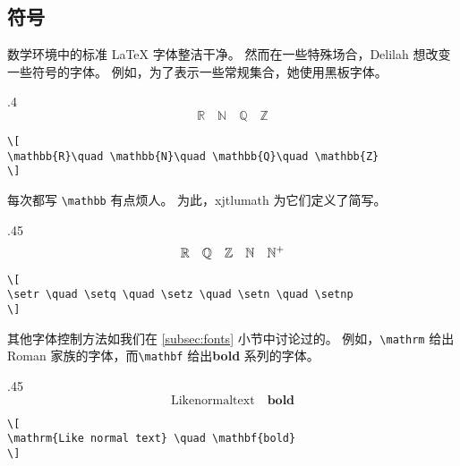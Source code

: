 \subsection{符号}
数学环境中的标准 \LaTeX{} 字体整洁干净。 然而在一些特殊场合，Delilah 想改变一些符号的字体。 例如，为了表示一些常规集合，她使用黑板字体。
\begin{parexammar}{.4\textandmarginlen}{
\[
\mathbb{R}\quad \mathbb{N}\quad \mathbb{Q}\quad \mathbb{Z}
\]
}
\begin{lstlisting}
\[
\mathbb{R}\quad \mathbb{N}\quad \mathbb{Q}\quad \mathbb{Z}
\]
\end{lstlisting}
\end{parexammar}

每次都写 \verb=\mathbb= 有点烦人。 为此，xjtlumath 为它们定义了简写。
\begin{parexammar}{.45\textandmarginlen}{
\[
\mathbb{R} \quad \mathbb{Q} \quad \mathbb{Z} \quad \mathbb{N} \quad \mathbb{N}^+
\]
}
\begin{lstlisting}
\[
\setr \quad \setq \quad \setz \quad \setn \quad \setnp
\]
\end{lstlisting}
\end{parexammar}

其他字体控制方法如我们在 \ref{subsec:fonts} 小节中讨论过的。 例如，\verb=\mathrm= 给出\textrm{Roman} 家族的字体，而\verb=\mathbf= 给出\textbf{bold} 系列的字体。
\begin{parexammar}{.45\textandmarginlen}{
\[
\mathrm{Like normal text} \quad \mathbf{bold}
\]
}
\begin{lstlisting}
\[
\mathrm{Like normal text} \quad \mathbf{bold}
\]
\end{lstlisting}
\end{parexammar}